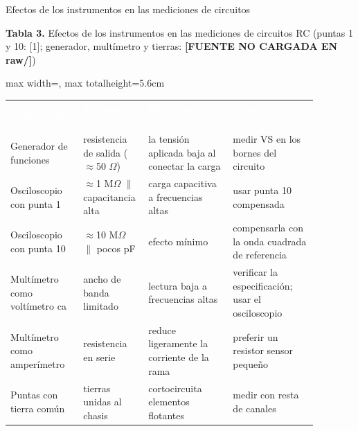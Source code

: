 \documentclass[aspectratio=169,11pt,xcolor={table}]{beamer}
\begin{document}
\begin{frame}{{\normalsize Efectos de los instrumentos en las mediciones de circuitos}}
\begin{center}
{\scriptsize\textbf{Tabla 3.} Efectos de los instrumentos en las mediciones de circuitos RC (puntas \texttimes{}1 y \texttimes{}10: [1]; generador, multímetro y tierras: \textcolor{iuborange}{\textbf{[FUENTE NO CARGADA EN raw/]}})\par}
\vspace{1mm}
\small
\renewcommand{\arraystretch}{1.35}
\begin{adjustbox}{max width=\linewidth, max totalheight=5.6cm}
\begin{tabular}{>{\raggedright\arraybackslash}p{0.176\linewidth}>{\raggedright\arraybackslash}p{0.176\linewidth}>{\raggedright\arraybackslash}p{0.264\linewidth}>{\raggedright\arraybackslash}p{0.264\linewidth}}
\rowcolor{iubnavy} \textcolor{white}{\textbf{Instrumento}} & \textcolor{white}{\textbf{Parámetro interno}} & \textcolor{white}{\textbf{Efecto sobre la medición}} & \textcolor{white}{\textbf{Cómo reducirlo}} \\
Generador de funciones & resistencia de salida (\ensuremath{\approx}50 \ensuremath{\Omega}) & la tensión aplicada baja al conectar la carga & medir VS en los bornes del circuito \\
\rowcolor{iubfondogris} Osciloscopio con punta \texttimes{}1 & \ensuremath{\approx}1 M\ensuremath{\Omega} \ensuremath{\parallel} capacitancia alta & carga capacitiva a frecuencias altas & usar punta \texttimes{}10 compensada \\
Osciloscopio con punta \texttimes{}10 & \ensuremath{\approx}10 M\ensuremath{\Omega} \ensuremath{\parallel} pocos pF & efecto mínimo & compensarla con la onda cuadrada de referencia \\
\rowcolor{iubfondogris} Multímetro como voltímetro ca & ancho de banda limitado & lectura baja a frecuencias altas & verificar la especificación; usar el osciloscopio \\
Multímetro como amperímetro & resistencia en serie & reduce ligeramente la corriente de la rama & preferir un resistor sensor pequeño \\
\rowcolor{iubfondogris} Puntas con tierra común & tierras unidas al chasis & cortocircuita elementos flotantes & medir con resta de canales \\
\bottomrule
\end{tabular}
\end{adjustbox}
\end{center}
\end{frame}
\end{document}
